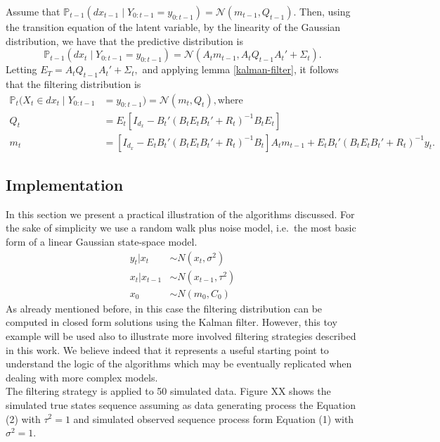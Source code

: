 \documentclass[
]{book}
\theoremstyle{break}
\theoremstyle{nonumberplain}
\begin{document}
Assume that
\(\mathbb{P}_{t-1}(dx_{t-1}\mid Y_{0:t-1}=y_{0:t-1})=\mathcal N(m_{t-1},Q_{t-1}).\)
Then, using the transition equation of the latent variable, by the
linearity of the Gaussian distribution, we have that the predictive
distribution is \begin{equation}
\mathbb{P}_{t-1}(dx_{t}\mid Y_{0:t-1}=y_{0:t-1})=\mathcal N(A_tm_{t-1},A_tQ_{t-1}A_t'+\Sigma_t).
\end{equation} Letting \(E_T=A_tQ_{t-1}A_t'+\Sigma_t,\) and applying
lemma \ref{kalman-filter}, it follows that the filtering distribution is
\begin{align*}
  \mathbb{P}_{t}(X_t\in dx_{t}\mid Y_{0:t-1}&=y_{0:t-1})=\mathcal N(m_t,Q_t), \text{where} \\ Q_t&=E_t[I_{d_x} - B_t'(B_tE_tB_t'+R_t)^{-1} B_tE_t] \\
  m_t &= [I_{d_x} - E_tB_t'(B_tE_tB_t'+R_t)^{-1} B_t]A_tm_{t-1}+E_tB_t'(B_tE_tB_t'+R_t)^{-1}y_t.
\end{align*}

\subsection{Implementation}

In this section we present a practical illustration of the algorithms
discussed. For the sake of simplicity we use a random walk plus noise
model, i.e.~the most basic form of a linear Gaussian state-space
model.\\
\begin{align}
y_{t}|x_{t} & \sim N(x_{t},\sigma^{2}) \\
x_{t}|x_{t-1} & \sim N(x_{t-1},\tau^{2}) \\
x_{0} & \sim N(m_{0},C_{0})
\end{align} As already mentioned before, in this case the filtering
distribution can be computed in closed form solutions using the Kalman
filter. However, this toy example will be used also to illustrate more
involved filtering strategies described in this work. We believe indeed
that it represents a useful starting point to understand the logic of
the algorithms which may be eventually replicated when dealing with more
complex models.\\
The filtering strategy is applied to 50 simulated data. Figure XX shows
the simulated true states sequence assuming as data generating process
the Equation (2) with \(\tau^{2}=1\) and simulated observed sequence
process form Equation (1) with \(\sigma^{2}=1\).
\end{document}
